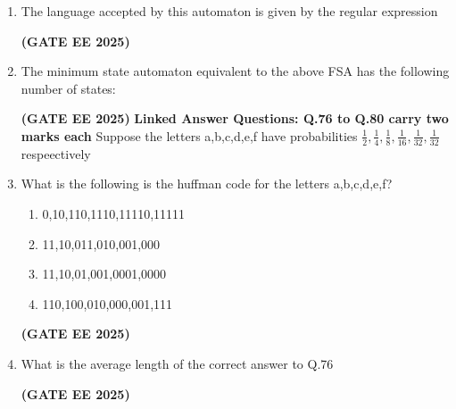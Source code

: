 \documentclass[journal,12pt,onecolumn]{IEEEtran}
\theoremstyle{remark}
\begin{document}
\begin{enumerate}
\item The language accepted by this automaton is given by the regular expression
\begin{enumerate}
\end{enumerate}
\hfill \textbf{(GATE EE 2025)}
\item The minimum state automaton equivalent to the above FSA has the following number of states:
\begin{enumerate}
\end{enumerate}
\hfill \textbf{(GATE EE 2025)}
\newline
\textbf{Linked Answer Questions: Q.76 to Q.80 carry two marks each}
\newline
Suppose the letters a,b,c,d,e,f have probabilities $\frac{1}{2},\frac{1}{4},\frac{1}{8},\frac{1}{16},\frac{1}{32},\frac{1}{32}$ respeectively 


\item What is the following is the huffman code for the letters a,b,c,d,e,f?
\begin{enumerate}
    \item 0,10,110,1110,11110,11111
    \item 11,10,011,010,001,000
    \item 11,10,01,001,0001,0000
    \item 110,100,010,000,001,111
\end{enumerate}
\hfill \textbf{(GATE EE 2025)}
\item What is the average length of the correct answer to Q.76
\begin{enumerate}
\end{enumerate}
 \hfill \textbf{(GATE EE 2025)}


\end{enumerate}
\end{document}
